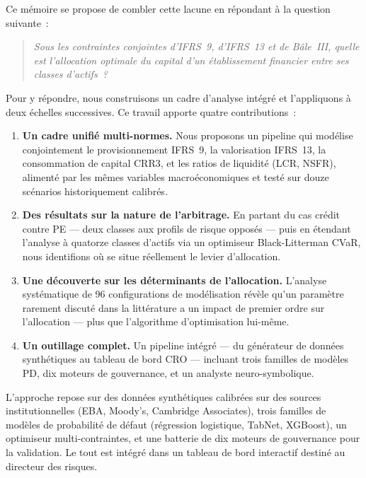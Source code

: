\documentclass[12pt, a4paper, twoside, openright]{report}
\theoremstyle{definition}
\begin{document}

Ce mémoire se propose de combler cette lacune en répondant à la question suivante~:

\medskip
\begin{quote}
\itshape
Sous les contraintes conjointes d'IFRS~9, d'IFRS~13 et de Bâle~III, quelle est l'allocation optimale du capital d'un établissement financier entre ses classes d'actifs~?
\end{quote}
\medskip

Pour y répondre, nous construisons un cadre d'analyse intégré et l'appliquons à deux échelles successives.
Ce travail apporte quatre contributions~:

\begin{enumerate}
  \item \textbf{Un cadre unifié multi-normes.}
  Nous proposons un pipeline qui modélise conjointement le provisionnement IFRS~9, la valorisation IFRS~13, la consommation de capital CRR3, et les ratios de liquidité (LCR, NSFR), alimenté par les mêmes variables macroéconomiques et testé sur douze scénarios historiquement calibrés.

  \item \textbf{Des résultats sur la nature de l'arbitrage.}
  En partant du cas crédit contre PE --- deux classes aux profils de risque opposés --- puis en étendant l'analyse à quatorze classes d'actifs via un optimiseur Black-Litterman CVaR, nous identifions où se situe réellement le levier d'allocation.

  \item \textbf{Une découverte sur les déterminants de l'allocation.}
  L'analyse systématique de 96 configurations de modélisation révèle qu'un paramètre rarement discuté dans la littérature a un impact de premier ordre sur l'allocation --- plus que l'algorithme d'optimisation lui-même.

  \item \textbf{Un outillage complet.}
  Un pipeline intégré --- du générateur de données synthétiques au tableau de bord CRO --- incluant trois familles de modèles PD, dix moteurs de gouvernance, et un analyste neuro-symbolique.
\end{enumerate}

L'approche repose sur des données synthétiques calibrées sur des sources institutionnelles (EBA, Moody's, Cambridge Associates), trois familles de modèles de probabilité de défaut (régression logistique, TabNet, XGBoost), un optimiseur multi-contraintes, et une batterie de dix moteurs de gouvernance pour la validation.
Le tout est intégré dans un tableau de bord interactif destiné au directeur des risques.
\end{document}
